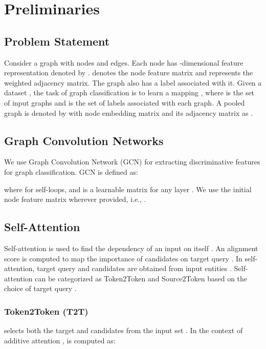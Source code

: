 \documentclass[letterpaper]{article} \usepackage{aaai20}  \usepackage{times}  \usepackage{helvet} \usepackage{courier}  \usepackage[hyphens]{url}  \usepackage{graphicx} \urlstyle{rm} \def\UrlFont{\rm}  \usepackage{graphicx}  \frenchspacing  \setlength{\pdfpagewidth}{8.5in}  \setlength{\pdfpageheight}{11in}
\begin{document}
%
 


\section{Preliminaries}
\subsection{Problem Statement}
Consider a graph  with  nodes and  edges. Each node  has -dimensional feature representation denoted by .  denotes the node feature matrix and  represents the weighted adjacency matrix. The graph  also has a label  associated with it. Given a dataset , the task of graph classification is to learn a mapping , where  is the set of input graphs and  is the set of labels associated with each graph. A pooled graph is denoted by  with node embedding matrix  and its adjacency matrix as .


\subsection{Graph Convolution Networks} We use Graph Convolution Network (GCN) \cite{gcn} for extracting discriminative features for graph classification. GCN is defined as:

where  for self-loops,  and  is a learnable matrix for any layer . We use the initial node feature matrix wherever provided, i.e., .










\subsection{Self-Attention}
\label{sec:self_attn}
Self-attention is used to find the dependency of an input on itself \cite{SA-cheng,vaswani}. An alignment score  is computed to map the importance of candidates  on target query . In self-attention, target query  and candidates  are obtained from input entities . Self-attention can be categorized as Token2Token and Source2Token based on the choice of target query  \cite{disan}.

\subsubsection{Token2Token (T2T)} selects both the target and candidates from the input set . In the context of additive attention \cite{bahdanau},  is computed as:
\end{document}

